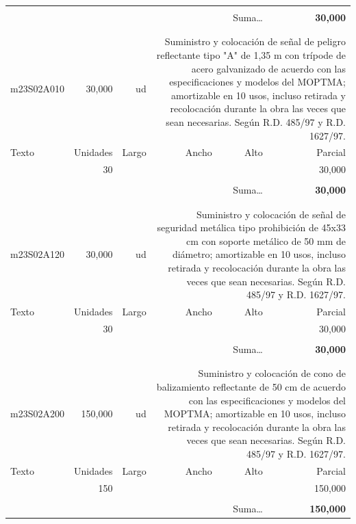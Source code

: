 \documentclass{book}%
\begin{document}
\begin{longtable}{lrrrrr}
&&&&&\\%
\multicolumn{5}{r}{Suma\ldots}&\textbf{    30,000}\\%
\hline%
&&&&&\\%
&&&&&\\%
m23S02A010&    30,000& ud&\multicolumn{3}{p{6cm}}{\scriptsize Suministro y colocación de señal de peligro reflectante tipo "A" de 1,35 m con trípode de acero galvanizado de acuerdo con las especificaciones y modelos del MOPTMA; amortizable en 10 usos, incluso retirada y recolocación durante la obra las veces que sean necesarias. Según R.D. 485/97 y R.D. 1627/97.\normalsize}\\%
Texto&Unidades&Largo&Ancho&Alto&Parcial\\%
\hline%
\multicolumn{1}{p{3.5cm}}{ }&30&&&&    30,000\\%
&&&&&\\%
\multicolumn{5}{r}{Suma\ldots}&\textbf{    30,000}\\%
\hline%
&&&&&\\%
&&&&&\\%
m23S02A120&    30,000& ud&\multicolumn{3}{p{6cm}}{\scriptsize Suministro y colocación de señal de seguridad metálica tipo prohibición de 45x33 cm con soporte metálico de 50 mm de diámetro; amortizable en 10 usos, incluso retirada y recolocación durante la obra las veces que sean necesarias. Según R.D. 485/97 y R.D. 1627/97.\normalsize}\\%
Texto&Unidades&Largo&Ancho&Alto&Parcial\\%
\hline%
\multicolumn{1}{p{3.5cm}}{ }&30&&&&    30,000\\%
&&&&&\\%
\multicolumn{5}{r}{Suma\ldots}&\textbf{    30,000}\\%
\hline%
&&&&&\\%
&&&&&\\%
m23S02A200&   150,000& ud&\multicolumn{3}{p{6cm}}{\scriptsize Suministro y colocación de cono de balizamiento reflectante de 50 cm de acuerdo con las especificaciones y modelos del MOPTMA; amortizable en 10 usos, incluso retirada y recolocación durante la obra las veces que sean necesarias. Según R.D. 485/97 y R.D. 1627/97.\normalsize}\\%
Texto&Unidades&Largo&Ancho&Alto&Parcial\\%
\hline%
\multicolumn{1}{p{3.5cm}}{ }&150&&&&   150,000\\%
&&&&&\\%
\multicolumn{5}{r}{Suma\ldots}&\textbf{   150,000}\\%

\end{longtable}
\end{document}
